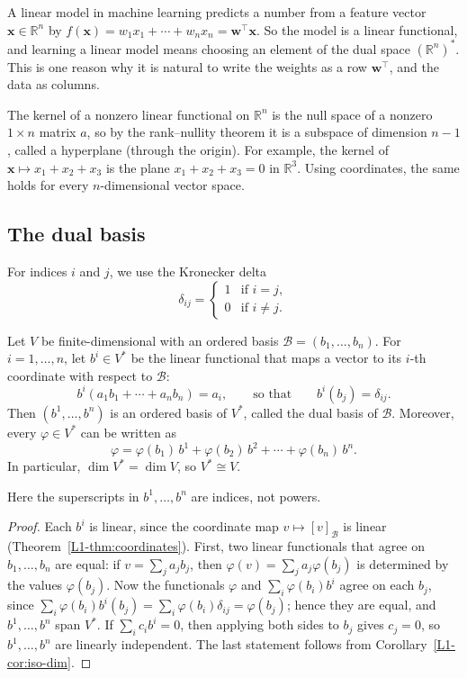\begin{remark}
    A linear model in machine learning predicts a number from a feature vector $\mathbf{x} \in \mathbb{R}^n$ by $f(\mathbf{x}) = w_1 x_1 + \cdots + w_n x_n = \mathbf{w}^\top \mathbf{x}$. So the model is a linear functional, and learning a linear model means choosing an element of the dual space $(\mathbb{R}^n)^*$. This is one reason why it is natural to write the weights as a row $\mathbf{w}^\top$, and the data as columns.
\end{remark}

The kernel of a nonzero linear functional on $\mathbb{R}^n$ is the null space of a nonzero $1 \times n$ matrix $a$, so by the rank--nullity theorem it is a subspace of dimension $n - 1$, called a hyperplane (through the origin). For example, the kernel of $\mathbf{x} \mapsto x_1 + x_2 + x_3$ is the plane $x_1 + x_2 + x_3 = 0$ in $\mathbb{R}^3$. Using coordinates, the same holds for every $n$-dimensional vector space.

\subsection{The dual basis}

For indices $i$ and $j$, we use the Kronecker delta
\[\delta_{ij} = \begin{cases} 1 & \text{if } i = j, \\ 0 & \text{if } i \neq j. \end{cases}\]

\begin{theorem}\label{L1-thm:dual-basis}
    Let $V$ be finite-dimensional with an ordered basis $\mathcal{B} = (b_1, \ldots, b_n)$. For $i = 1, \ldots, n$, let $b^i \in V^*$ be the linear functional that maps a vector to its $i$-th coordinate with respect to $\mathcal{B}$:
    \[b^i(a_1 b_1 + \cdots + a_n b_n) = a_i, \qquad \text{so that} \qquad b^i(b_j) = \delta_{ij}.\]
    Then $(b^1, \ldots, b^n)$ is an ordered basis of $V^*$, called the dual basis of $\mathcal{B}$. Moreover, every $\varphi \in V^*$ can be written as
    \[\varphi = \varphi(b_1)\, b^1 + \varphi(b_2)\, b^2 + \cdots + \varphi(b_n)\, b^n.\]
    In particular, $\dim V^* = \dim V$, so $V^* \cong V$.
\end{theorem}

Here the superscripts in $b^1, \ldots, b^n$ are indices, not powers.

\begin{proof}
    Each $b^i$ is linear, since the coordinate map $v \mapsto [v]_{\mathcal{B}}$ is linear (Theorem~\ref{L1-thm:coordinates}). First, two linear functionals that agree on $b_1, \ldots, b_n$ are equal: if $v = \sum_j a_j b_j$, then $\varphi(v) = \sum_j a_j \varphi(b_j)$ is determined by the values $\varphi(b_j)$. Now the functionals $\varphi$ and $\sum_i \varphi(b_i) b^i$ agree on each $b_j$, since $\sum_i \varphi(b_i) b^i(b_j) = \sum_i \varphi(b_i)\delta_{ij} = \varphi(b_j)$; hence they are equal, and $b^1, \ldots, b^n$ span $V^*$. If $\sum_i c_i b^i = 0$, then applying both sides to $b_j$ gives $c_j = 0$, so $b^1, \ldots, b^n$ are linearly independent. The last statement follows from Corollary~\ref{L1-cor:iso-dim}.
\end{proof}

